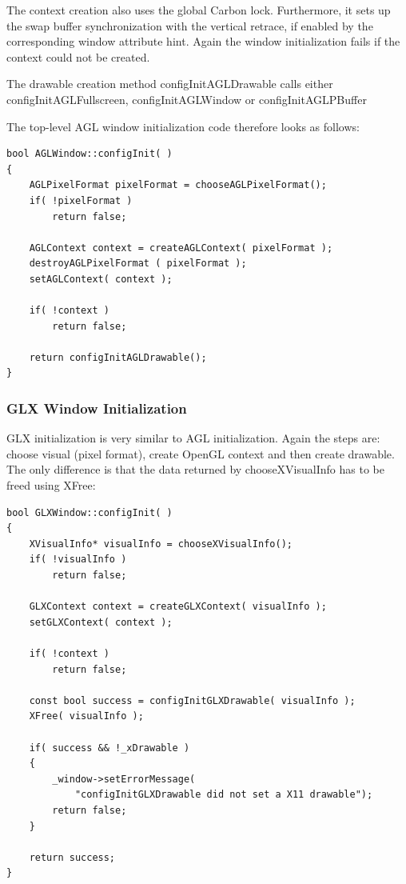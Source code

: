 \documentclass[10pt,a4]{scrartcl}
\begin{document}
The context creation also uses the global Carbon lock. Furthermore, it
sets up the swap buffer synchronization with the vertical retrace, if
enabled by the corresponding window attribute hint. Again the window
initialization fails if the context could not be created.

The drawable creation method \textsf{configInitAGLDrawable} calls either
\textsf{configInitAGLFullscreen}, \textsf{configInitAGLWindow} or \textsf{configInitAGLPBuffer}

The top-level AGL window initialization code therefore looks as follows:

{\footnotesize\begin{lstlisting}
bool AGLWindow::configInit( )
{
    AGLPixelFormat pixelFormat = chooseAGLPixelFormat();
    if( !pixelFormat )
        return false;

    AGLContext context = createAGLContext( pixelFormat );
    destroyAGLPixelFormat ( pixelFormat );
    setAGLContext( context );

    if( !context )
        return false;

    return configInitAGLDrawable();
}
\end{lstlisting}}


\subsubsection{GLX Window Initialization}

GLX initialization is very similar to AGL initialization. Again the
steps are: choose visual (pixel format), create OpenGL context and then
create drawable. The only difference is that the data returned by
\textsf{chooseXVisualInfo} has to be freed using \textsf{XFree}:

{\footnotesize\begin{lstlisting}
bool GLXWindow::configInit( )
{
    XVisualInfo* visualInfo = chooseXVisualInfo();
    if( !visualInfo )
        return false;

    GLXContext context = createGLXContext( visualInfo );
    setGLXContext( context );

    if( !context )
        return false;

    const bool success = configInitGLXDrawable( visualInfo );
    XFree( visualInfo );

    if( success && !_xDrawable )
    {
        _window->setErrorMessage( 
            "configInitGLXDrawable did not set a X11 drawable");
        return false;
    }

    return success;    
}
\end{lstlisting}}
\end{document}
